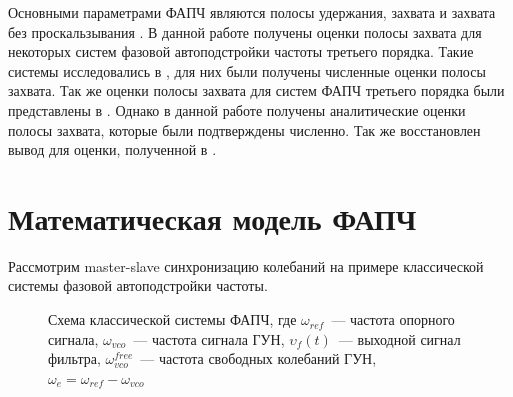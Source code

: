 \documentclass[a4paper,14pt]{article} %
\theoremstyle{cited}
\begin{document}
Основными параметрами ФАПЧ являются полосы удержания, захвата и захвата без проскальзывания \cite{shahgildyan}. В данной работе получены оценки полосы захвата для некоторых систем фазовой автоподстройки частоты третьего порядка. Такие системы исследовались в \cite{kuznetsov_article}, для них были получены численные оценки полосы захвата. Так же оценки полосы захвата для систем ФАПЧ третьего порядка были представлены в \cite{kuznetsov}. Однако в данной работе получены аналитические оценки полосы захвата, которые были подтверждены численно. Так же восстановлен вывод для оценки, полученной в \cite{kuznetsov}.

\newpage
\section{Математическая модель ФАПЧ}
Рассмотрим master-slave синхронизацию колебаний на примере классической системы фазовой автоподстройки частоты.
\begin{figure}[H]
\begin{center}
\end{center}
\caption{Схема классической системы ФАПЧ, где $\omega_{ref}$~--- частота опорного сигнала, $\omega_{vco}$~--- частота сигнала ГУН, $\upsilon_f(t)$~--- выходной сигнал фильтра, $\omega_{vco}^{free}$~--- частота свободных колебаний ГУН, $\omega_e = \omega_{ref}-\omega_{vco}$}
\end{figure}
\end{document}
